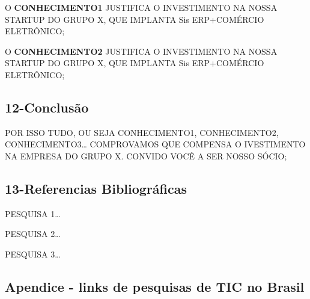 \documentclass[
]{book}
\begin{document}
O \textbf{CONHECIMENTO1} JUSTIFICA O INVESTIMENTO NA NOSSA STARTUP DO GRUPO X, QUE IMPLANTA Sis ERP+COMÉRCIO ELETRÔNICO;

O \textbf{CONHECIMENTO2} JUSTIFICA O INVESTIMENTO NA NOSSA STARTUP DO GRUPO X, QUE IMPLANTA Sis ERP+COMÉRCIO ELETRÔNICO;

\subsection{12-Conclusão}\label{conclusuxe3o}

POR ISSO TUDO, OU SEJA CONHECIMENTO1, CONHECIMENTO2, CONHECIMENTO3\ldots{} COMPROVAMOS QUE COMPENSA O IVESTIMENTO NA EMPRESA DO GRUPO X. CONVIDO VOCÊ A SER NOSSO SÓCIO;

\subsection{13-Referencias Bibliográficas}\label{referencias-bibliogruxe1ficas}

PESQUISA 1\ldots{}

PESQUISA 2\ldots{}

PESQUISA 3\ldots{}

\subsection{Apendice - links de pesquisas de TIC no Brasil}\label{apendice---links-de-pesquisas-de-tic-no-brasil}
\end{document}
